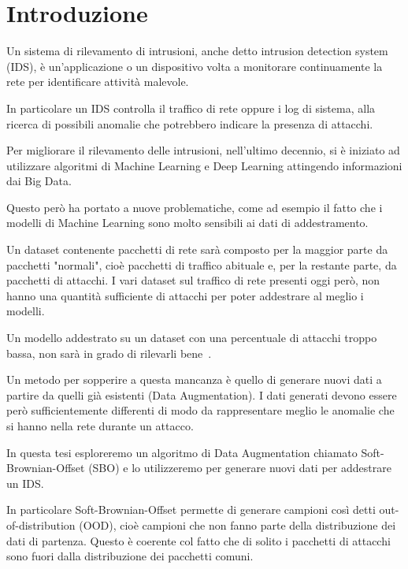 \chapter{Introduzione}

Un sistema di rilevamento di intrusioni, anche detto intrusion detection system (IDS),  è un'applicazione o un dispositivo volta a monitorare continuamente la rete per identificare attività malevole. 

In particolare un IDS controlla il traffico di rete oppure i log di sistema, alla ricerca di possibili anomalie che potrebbero indicare la presenza di attacchi.

Per migliorare il rilevamento delle intrusioni, nell'ultimo decennio, si è iniziato ad utilizzare algoritmi di Machine Learning e Deep Learning attingendo informazioni dai Big Data. \cite{NetworkIntrusionDetection2021}

Questo però ha portato a nuove problematiche, come ad esempio il fatto che i modelli di Machine Learning sono molto sensibili ai dati di addestramento.


Un dataset contenente pacchetti di rete sarà composto per la maggior parte da pacchetti "normali", cioè pacchetti di traffico abituale e, per la restante parte, da pacchetti di attacchi. 
I vari dataset sul traffico di rete presenti oggi però, non hanno una quantità sufficiente di attacchi per poter addestrare al meglio i modelli. 

Un modello addestrato su un dataset con una percentuale di attacchi troppo bassa, non sarà in grado di rilevarli bene~\cite{gopalanBalancingApproachesML2021}.

Un metodo per sopperire a questa mancanza è quello di generare nuovi dati a partire da quelli già esistenti (Data Augmentation). I dati generati devono essere però sufficientemente differenti di modo da rappresentare meglio le anomalie che si hanno nella rete durante un attacco.


In questa tesi esploreremo un algoritmo di Data Augmentation chiamato Soft-Brownian-Offset (SBO) \cite{sbo} e lo utilizzeremo per generare nuovi dati per addestrare un IDS.

In particolare Soft-Brownian-Offset permette di generare campioni così detti out-of-distribution (OOD), cioè campioni che non fanno parte della distribuzione dei dati di partenza. Questo è coerente col fatto che di solito i pacchetti di attacchi sono fuori dalla distribuzione dei pacchetti comuni.


